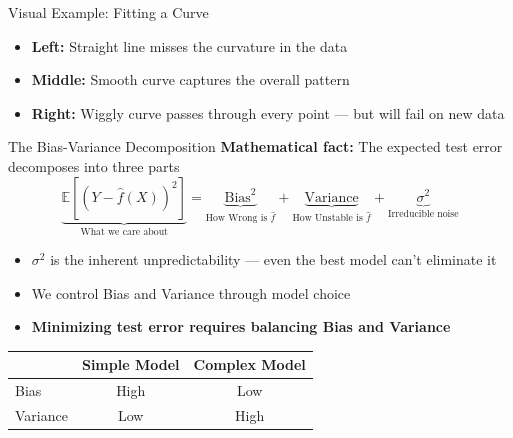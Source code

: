 \documentclass[10pt]{beamer}
\newcommand{\highlight}[1]{\textcolor{AccentOrange}{\textbf{#1}}}
\begin{document}
\begin{frame}{Visual Example: Fitting a Curve}
  \vspace{0.5em}
  \begin{itemize}
    \item \textbf{Left:} Straight line misses the curvature in the data
    \item \textbf{Middle:} Smooth curve captures the overall pattern
    \item \textbf{Right:} Wiggly curve passes through every point --- but will fail on new data
  \end{itemize}
\end{frame}

\begin{frame}{The Bias-Variance Decomposition}
  \textbf{Mathematical fact:} The expected test error decomposes into three parts
  \[
  \underbrace{\mathbb{E}\left[(Y - \widehat{f}(X))^2\right]}_{\text{What we care about}} = \underbrace{\text{Bias}^2}_{\text{How Wrong is $\widehat{f}$}} + \underbrace{\text{Variance}}_{\text{How Unstable is $\widehat{f}$}} + \underbrace{\sigma^2}_{\text{Irreducible noise}}
  \]
  
  \vspace{0.5em}
  \begin{itemize}
    \item $\sigma^2$ is the inherent unpredictability --- even the best model can't eliminate it
    \item We control Bias and Variance through model choice
    \item \highlight{Minimizing test error requires balancing Bias and Variance}
  \end{itemize}
  
  \vspace{0.5em}
  \begin{center}
    \begin{tabular}{lcc}
    \toprule
    & \textbf{Simple Model} & \textbf{Complex Model} \\
    \midrule
    Bias & High & Low \\
    Variance & Low & High \\
    \bottomrule
    \end{tabular}
  \end{center}
\end{frame}
\end{document}
